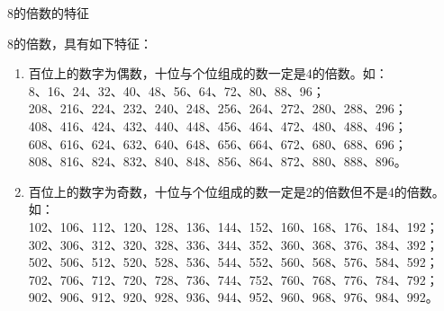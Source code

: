 \documentclass[aspectratio=169]{ctexbeamer} %
\date{\today}
\begin{document}
\begin{frame}[t]{8的倍数的特征}
\begin{spacing}{1.2}
\normalsize
8的倍数，具有如下特征：
\begin{enumerate}[label={\arabic*.}]
\item \alert{百位上的数字为偶数，十位与个位组成的数一定是4的倍数。如：} \\
8、16、24、32、40、48、56、64、72、80、88、96；\\
208、216、224、232、240、248、256、264、272、280、288、296； \\
408、416、424、432、440、448、456、464、472、480、488、496； \\
608、616、624、632、640、648、656、664、672、680、688、696； \\
808、816、824、832、840、848、856、864、872、880、888、896。 
\item \alert{百位上的数字为奇数，十位与个位组成的数一定是2的倍数但不是4的倍数。如：} \\
102、106、112、120、128、136、144、152、160、168、176、184、192；\\
302、306、312、320、328、336、344、352、360、368、376、384、392；\\
502、506、512、520、528、536、544、552、560、568、576、584、592；\\
702、706、712、720、728、736、744、752、760、768、776、784、792；\\
902、906、912、920、928、936、944、952、960、968、976、984、992。
\end{enumerate}

\end{spacing}
\end{frame}
\end{document}
